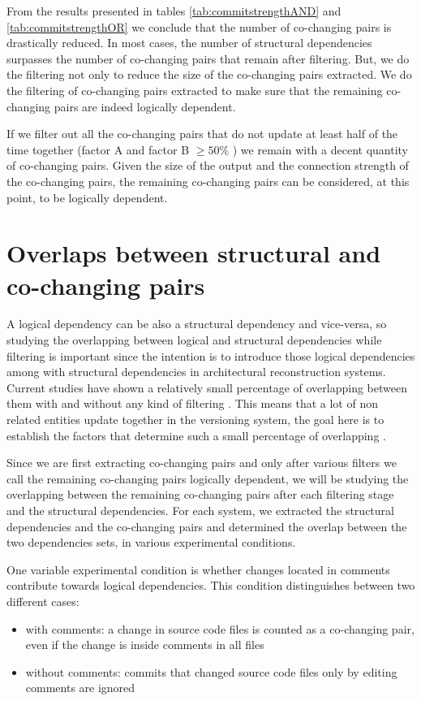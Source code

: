 From the results presented in tables \ref{tab:commitstrengthAND} and \ref{tab:commitstrengthOR} we conclude that the number of co-changing pairs is drastically reduced. In most cases, the number of structural dependencies surpasses the number of co-changing pairs that remain after filtering. But, we do the filtering not only to reduce the size of the co-changing pairs extracted. We do the filtering of co-changing pairs extracted to make sure that the remaining co-changing pairs are indeed logically dependent.

If we filter out all the co-changing pairs that do not update at least half of the time together (factor A and factor B $\geq 50 \%$ ) we remain with a decent quantity of co-changing pairs. Given the size of the output and the connection strength of the co-changing pairs, the remaining co-changing pairs can be considered, at this point, to be logically dependent. 




\section{Overlaps between structural and co-changing pairs}
\label{sec:overlaps}

A logical dependency can be also a structural dependency and vice-versa, so studying the overlapping between logical and structural dependencies while filtering is important since the intention is to introduce those logical dependencies among with structural dependencies in architectural reconstruction systems. Current studies have shown a relatively small percentage of overlapping between them with and without any kind of filtering \cite{DBLP:journals/jss/AjienkaC17}. This means that a lot of non related entities update together in the versioning system, the goal here is to establish the factors that determine such a small percentage of overlapping \cite{enase19}.

Since we are first extracting co-changing pairs and only after various filters we call the remaining co-changing pairs logically dependent, we will be studying the overlapping between the remaining co-changing pairs after each filtering stage and the structural dependencies. 
For each system, we extracted the structural dependencies and the co-changing pairs and determined the overlap between the two dependencies sets, in various experimental conditions. 

One variable experimental condition is whether changes located in comments contribute towards logical dependencies. This condition distinguishes between two different cases: 
\begin{itemize}
	\item with comments: a change in source code files is counted as a co-changing pair, even if the change is inside comments in all files
	\item without comments: commits that changed source code files only by editing comments are ignored
\end{itemize}

